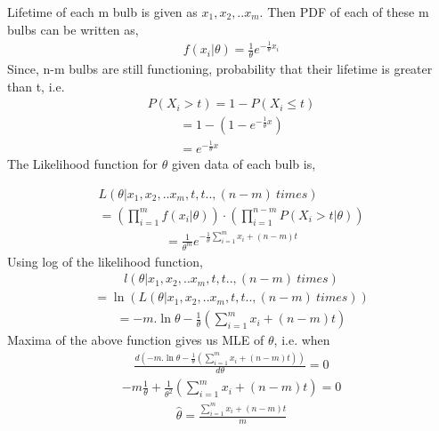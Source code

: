 \documentclass[journal,12pt,twocolumn]{IEEEtran}
\begin{document}
Lifetime of each m bulb is given as $x_{1},x_{2},..x_{m}$. Then PDF of each of these m bulbs can be written as,
\begin{align}
    f(x_{i}| \theta) = \frac{1}{\theta}e^{-\frac{1}{\theta} x_{i}}
\end{align}
Since, n-m bulbs are still functioning, probability that their lifetime is greater than t, i.e.
\begin{align}
    P(X_{i}>t) = 1 - P(X_{i}\leq t)
\end{align}
\begin{align}
     = 1 - (1- e^{-\frac{1}{\theta} x}) \\
     = e^{-\frac{1}{\theta} x}
\end{align}
The Likelihood function for $\theta$ given data of each bulb is,

\begin{align}
    L(\theta|x_{1},x_{2},..x_{m},t,t..,(n-m)\ times)\\ 
   = \left( \prod_{i=1}^{m} f(x_{i}|\theta) \right)\cdot \left( \prod_{i=1}^{n-m} P(X_{i}>t|\theta) \right)
\end{align}
\begin{align}
    = \frac{1}{\theta^{m}} e^{-\frac{1}{\theta} \sum_{i=1}^{m} x_{i}+(n-m)t}
\end{align}
Using log of the likelihood function,
\begin{align}
    l(\theta|x_{1},x_{2},..x_{m},t,t..,(n-m)\ times) 
\end{align}
\begin{align}
   = \ln(L(\theta|x_{1},x_{2},..x_{m},t,t..,(n-m)\ times))
\end{align}
\begin{align}
   = -m.\ln \theta - \frac{1}{\theta} \left(\sum_{i=1}^{m} x_{i}+(n-m)t\right)
\end{align}
Maxima of the above function gives us MLE of $\theta$, i.e. when
\begin{align}
    \frac{d\left(-m.\ln \theta - \frac{1}{\theta} \left(\sum_{i=1}^{m} x_{i}+(n-m)t\right)\right)}{d\theta} = 0
\end{align}
\begin{align}
    -m\frac{1}{\theta}+\frac{1}{\theta^2}\left(\sum_{i=1}^{m} x_{i}+(n-m)t\right) = 0
\end{align}
\begin{align}
    \hat{\theta} = \frac{\sum_{i=1}^{m} x_{i}+(n-m)t}{m}
\end{align}
\end{document}
